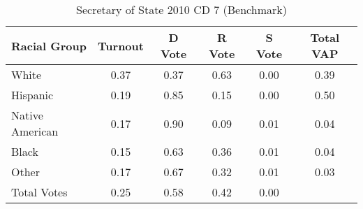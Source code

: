 \begin{table}[htb]
\begin{center}
\caption{Secretary of State 2010 CD 7 (Benchmark)}
\label{sos10_vap_cd_7_benchmark}
\begin{tabular}{lccccc}
  \hline
Racial Group & Turnout & D Vote & R Vote & S Vote & Total VAP \\ 
  \hline
White & 0.37 & 0.37 & 0.63 & 0.00 & 0.39 \\ 
  Hispanic & 0.19 & 0.85 & 0.15 & 0.00 & 0.50 \\ 
  Native American & 0.17 & 0.90 & 0.09 & 0.01 & 0.04 \\ 
  Black & 0.15 & 0.63 & 0.36 & 0.01 & 0.04 \\ 
  Other & 0.17 & 0.67 & 0.32 & 0.01 & 0.03 \\ 
  Total Votes & 0.25 & 0.58 & 0.42 & 0.00 &  \\ 
   \hline
\end{tabular}
\end{center}
\end{table}
